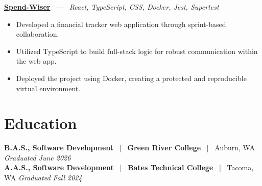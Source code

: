 \documentclass[10pt, letterpaper]{article}
\newcommand{\jobhead}[4]{%
  \vspace{5pt}%
  {\bfseries\color{dark}#1}%
  ~{\color{light}|}~%
  {\bfseries\color{navy}#2}%
  ~{\color{light}|}~%
  {\color{light}#3}%
  \hfill{\color{light}\small\textit{#4}}\\[-2pt]%
}
\newcommand{\projhead}[3]{%
  \vspace{5pt}%
  {\bfseries\color{dark}\href{#2}{#1}}%
  ~{\color{light}---}~%
  {\color{light}\small\textit{#3}}\\[-2pt]%
}
\begin{document}
\projhead{Spend-Wiser}{https://github.com/JesseChum/w26-sdev372-spendwiser-finance-tracker}{React, TypeScript, CSS, Docker, Jest, Supertest}
\begin{itemize}
  \item Developed a financial tracker web application through sprint-based collaboration.
  \item Utilized TypeScript to build full-stack logic for robust communication within the web app.
  \item Deployed the project using Docker, creating a protected and reproducible virtual environment.
\end{itemize}

\section{Education}

\jobhead{B.A.S., Software Development}{Green River College}{Auburn, WA}{Graduated June 2026}
\jobhead{A.A.S., Software Development}{Bates Technical College}{Tacoma, WA}{Graduated Fall 2024}
\end{document}
